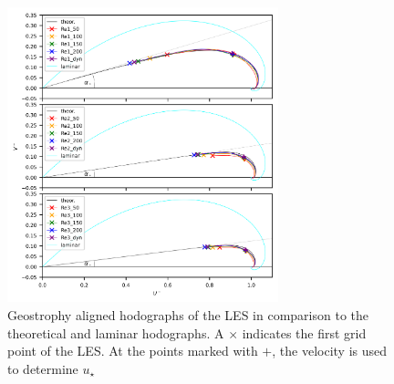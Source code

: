 \documentclass[a4paper,11pt]{article}
\begin{document}
\begin{figure}[ht]
	\centering
	\includegraphics[width=0.7\textwidth]{figures_2024/d3y_3Re_hodograph}
  \caption{Geostrophy aligned hodographs of the LES in comparison to the theoretical and laminar hodographs. A $\times$ indicates the first grid point of the LES. At the points marked with $+$, the velocity is used to determine $u_\star$}
  \label{3Re_hodograph}
\end{figure}
\end{document}
